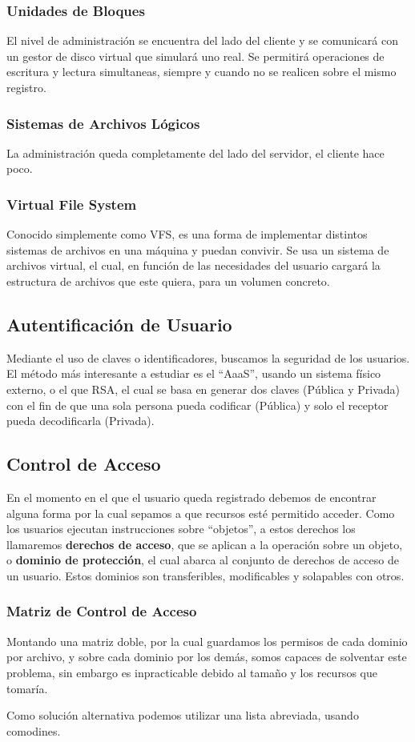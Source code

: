 \subsubsection{Unidades de Bloques}
\noindent El nivel de administración se encuentra del lado del cliente y se comunicará con un gestor de disco virtual que simulará uno real. Se permitirá operaciones de escritura y lectura simultaneas, siempre y cuando no se realicen sobre el mismo registro.
\subsubsection{Sistemas de Archivos Lógicos}
\noindent La administración queda completamente del lado del servidor, el cliente hace poco.
\subsubsection{Virtual File System}
\noindent Conocido simplemente como VFS, es una forma de implementar distintos sistemas de archivos en una máquina y puedan convivir. Se usa un sistema de archivos virtual, el cual, en función de las necesidades del usuario cargará la estructura de archivos que este quiera, para un volumen concreto.
\subsection{Autentificación de Usuario}
\noindent Mediante el uso de claves o identificadores, buscamos la seguridad de los usuarios. El método más interesante a estudiar es el ``AaaS'', usando un sistema físico externo, o el que RSA, el cual se basa en generar dos claves (Pública y Privada) con el fin de que una sola persona pueda codificar (Pública) y solo el receptor pueda decodificarla (Privada).
\subsection{Control de Acceso}
\noindent En el momento en el que el usuario queda registrado debemos de encontrar alguna forma por la cual sepamos a que recursos esté permitido acceder. Como los usuarios ejecutan instrucciones sobre ``objetos'', a estos derechos los llamaremos \textbf{derechos de acceso}, que se aplican a la operación sobre un objeto, o \textbf{dominio de protección}, el cual abarca al conjunto de derechos de acceso de un usuario. Estos dominios son transferibles, modificables y solapables con otros.
\subsubsection{Matriz de Control de Acceso}
\noindent Montando una matriz doble, por la cual guardamos los permisos de cada dominio por archivo, y sobre cada dominio por los demás, somos capaces de solventar este problema, sin embargo es inpracticable debido al tamaño y los recursos que tomaría.
\par \noindent Como solución alternativa podemos utilizar una lista abreviada, usando comodines.